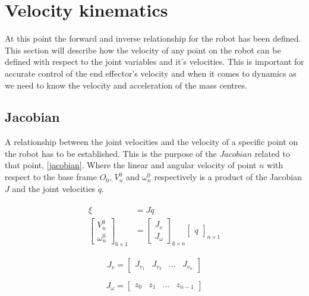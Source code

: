 \section{Velocity kinematics}
At this point the forward and inverse relationship for the robot has been defined. This section will describe how the velocity of any point on the robot can be defined with respect to the joint variables and it's velocities. This is important for accurate control of the end effector's velocity and when it comes to 
dynamics as we need to know the velocity and acceleration of the mass centres.
\subsection{Jacobian}

A relationship between the joint velocities and the velocity of a specific point on the robot has to be established. This is the purpose of the $Jacobian$ related to that point, \eqref{jacobian}. Where the linear and angular velocity of point $n$ with respect to the base frame $O_0$, $V^0_n$ and $\omega^0_n$ respectively is a product of the Jacobian $J$ and the joint velocities $\dot{q}$. 

\begin{align}\label{jacobian}
\begin{split}
\xi &= J\dot{q}\\
\begin{bmatrix}
V^0_n\\ 
\omega^0_n
\end{bmatrix}_{6\times 1}
&=
\begin{bmatrix}
J_v\\ 
J_\omega
\end{bmatrix}_{6\times n} \begin{bmatrix}
\dot{q}
\end{bmatrix}_{n\times 1}
\end{split}
\end{align}

\begin{equation}\label{Jvel}
J_v = \begin{bmatrix}
J_{v_1} & J_{v_2} & ... & J_{v_n}
\end{bmatrix}
\end{equation}

\begin{equation}\label{Jomega}
J_{\omega} = \begin{bmatrix}
z_0 & z_1 & ... & z_{n-1}
\end{bmatrix}
\end{equation}

